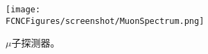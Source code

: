 \begin{figure}[H]
\centering
\texttt{[image: \\FCNCFigures/screenshot/MuonSpectrum.png]}
\caption{$\mu$子探测器。}
\label{fig:MuonSpectrum}
\end{figure}
